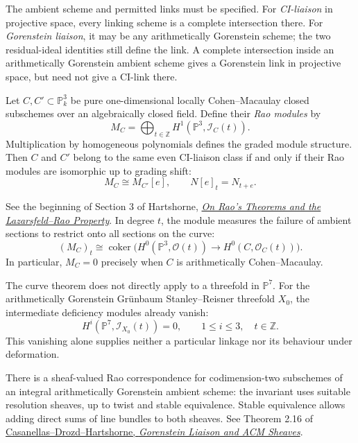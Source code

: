 The ambient scheme and permitted links
must be specified. For \emph{CI-liaison}
in projective space, every linking scheme
is a complete intersection there.
For \emph{Gorenstein liaison}, it may be
any arithmetically Gorenstein scheme;
the two residual-ideal identities still
define the link. A complete intersection
inside an arithmetically Gorenstein
ambient scheme gives a Gorenstein link
in projective space, but need not give a
CI-link there.

\begin{theorem}
\label{theorem-rao-space-curves}
Let $C,C'\subset\mathbb{P}^3_k$ be pure
one-dimensional locally Cohen--Macaulay
closed subschemes over an algebraically
closed field. Define their \emph{Rao
modules} by
$$
M_C=\bigoplus_{t\in\mathbb{Z}}
H^1(\mathbb{P}^3,\mathcal{I}_C(t)).
$$
Multiplication by homogeneous polynomials
defines the graded module structure.
Then $C$ and $C'$ belong to the same
even CI-liaison class if and only if
their Rao modules are isomorphic up to
grading shift:
$$
M_C\cong M_{C'}[e],
\qquad N[e]_t=N_{t+e}.
$$
\end{theorem}

\noindent
See the beginning of Section 3 of
Hartshorne,
\href{%
https://arxiv.org/abs/math/0302078%
}{\emph{On Rao's Theorems and the
Lazarsfeld--Rao Property}}.
In degree $t$, the module measures the
failure of ambient sections to restrict
onto all sections on the curve:
$$
(M_C)_t\cong
\operatorname{coker}\bigl(
H^0(\mathbb{P}^3,\mathcal{O}(t))
\longrightarrow
H^0(C,\mathcal{O}_C(t))\bigr).
$$
In particular, $M_C=0$ precisely when
$C$ is arithmetically Cohen--Macaulay.

\begin{remark}
\label{remark-rao-codimension-four}
The curve theorem does not directly apply
to a threefold in $\mathbb{P}^7$.
For the arithmetically Gorenstein
Gr\"unbaum Stanley--Reisner threefold
$X_0$, the intermediate deficiency
modules already vanish:
$$
H^i(\mathbb{P}^7,\mathcal{I}_{X_0}(t))=0,
\qquad
1\leq i\leq3,\quad t\in\mathbb{Z}.
$$
This vanishing alone supplies neither a
particular linkage nor its behaviour
under deformation.

There is a sheaf-valued Rao correspondence
for codimension-two subschemes of an
integral arithmetically Gorenstein
ambient scheme: the invariant uses
suitable resolution sheaves, up to
twist and stable equivalence.
Stable equivalence allows adding direct
sums of line bundles to both sheaves.
See Theorem 2.16 of
\href{%
https://arxiv.org/abs/math/0307378%
}{Casanellas--Drozd--Hartshorne,
\emph{Gorenstein Liaison and ACM Sheaves}}.
\end{remark}

